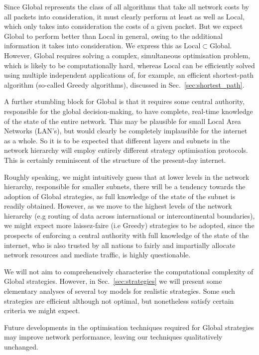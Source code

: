 \documentclass[aps,rmp,twocolumn,amsmath,amssymb,nofootinbib,superscriptaddress,longbibliography,floatfix]{revtex4-1}
\begin{document}
Since {\sc Global} represents the class of all algorithms that take all network costs by all packets into consideration, it must clearly perform at least as well as {\sc Local}, which only takes into consideration the costs of a given packet. But we expect {\sc Global} to perform better than {\sc Local} in general, owing to the additional information it takes into consideration. We express this as \mbox{{\sc Local}$\subset${\sc Global}}. However, {\sc Global} requires solving a complex, simultaneous optimisation problem, which is likely to be computationally hard, whereas {\sc Local} can be efficiently solved using multiple independent applications of, for example, an efficient shortest-path algorithm (so-called {\sc Greedy} algorithms), discussed in Sec.~\ref{sec:shortest_path}.

A further stumbling block for {\sc Global} is that it requires some central authority, responsible for the global decision-making, to have complete, real-time knowledge of the state of the entire network. This may be plausible for small Local Area Networks (LAN's), but would clearly be completely implausible for the internet as a whole. So it is to be expected that different layers and subnets in the network hierarchy will employ entirely different strategy optimisation protocols. This is certainly reminiscent of the structure of the present-day internet.

Roughly speaking, we might intuitively guess that at lower levels in the network hierarchy, responsible for smaller subnets, there will be a tendency towards the adoption of {\sc Global} strategies, as full knowledge of the state of the subnet is readily obtained. However, as we move to the highest levels of the network hierarchy (e.g routing of data across international or intercontinental boundaries), we might expect more laissez-faire (i.e {\sc Greedy}) strategies to be adopted, since the prospects of enforcing a central authority with full knowledge of the state of the internet, who is also trusted by all nations to fairly and impartially allocate network resources and mediate traffic, is highly questionable.

We will not aim to comprehensively characterise the computational complexity of {\sc Global} strategies. However, in Sec.~\ref{sec:strategies} we will present some elementary analyses of several toy models for realistic strategies. Some such strategies are efficient although not optimal, but nonetheless satisfy certain criteria we might expect.

Future developments in the optimisation techniques required for {\sc Global} strategies may improve network performance, leaving our techniques qualitatively unchanged.
\end{document}
